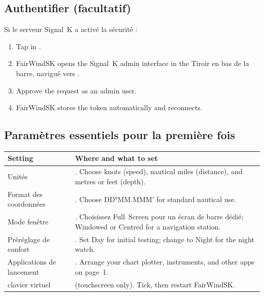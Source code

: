 \subsection{Authentifier (facultatif)}

Si le serveur Signal~K a activé la sécurité :

\begin{enumerate}
  \item Tap  in .
  \item FairWindSK opens the Signal~K admin interface in the
Tiroir en bas de la barre, navigué vers
        .
  \item Approve the request as an admin user.
  \item FairWindSK stores the token automatically and reconnects.
\end{enumerate}

\subsection{Paramètres essentiels pour la première fois}

\begin{longtable}{L{4.0cm}L{9.7cm}}
\toprule
{}
\color{white}\sffamily\bfseries Setting &
\color{white}\sffamily\bfseries Where and what to set \\
\midrule
Unités&
  .
  Choose knots (speed), nautical miles (distance), and metres or feet (depth). \\
Format des coordonnées&
  .
  Choose DD°MM.MMM' for standard nautical use. \\
Mode fenêtre&
  .
Choisissez Full~Screen pour un écran de barre dédié;
  Windowed or Centred for a navigation station. \\
Préréglage de confort&
  .
  Set Day for initial testing; change to Night for the night watch. \\
Applications de lancement&
  .
  Arrange your chart plotter, instruments, and other apps on page~1. \\
clavier virtuel&
   (touchscreen only).
  Tick, then restart FairWindSK. \\
\bottomrule
\end{longtable}

